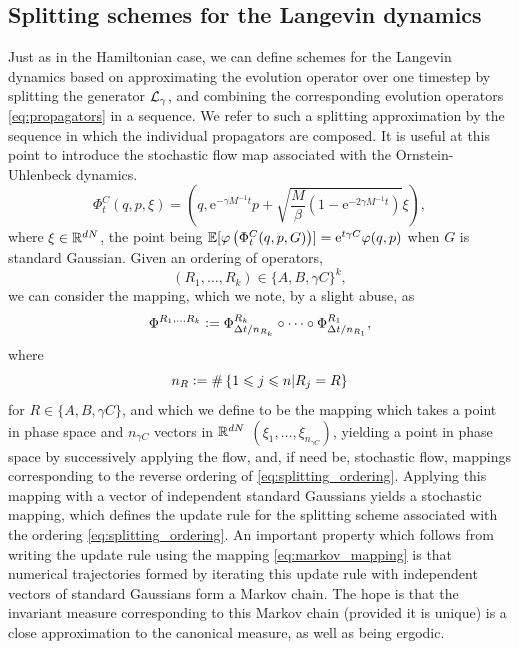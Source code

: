 \subsection{Splitting schemes for the Langevin dynamics}\label{section:splitting_schemes_langevin}
Just as in the Hamiltonian case, we can define schemes for the Langevin dynamics based on approximating the evolution operator over one timestep by splitting the generator $\mathcal{L}_\gamma$, and combining the corresponding evolution operators \eqref{eq:propagators} in a sequence.
We refer to such a splitting approximation by the sequence in which the individual propagators are composed. It is useful at this point to introduce the stochastic flow map associated with the Ornstein-Uhlenbeck dynamics.
\begin{equation}
    \label{eq:stochastic_flow_c}
    \Phi_t^C(q,p,\xi)=\left(q, \mathrm e^{-\gamma M^{-1}t}p + \sqrt{\frac{M}{\beta}(1-\mathrm{e}^{-2\gamma M^{-1}t})}\xi\right),
\end{equation}
where $\xi\in \mathbb{R}^{dN}$, the point being $\mathbb{E}[\varphi\left(\Phi_t^C(q,p,G)\right)]=\mathrm{e}^{t\gamma C}\varphi(q,p)$ when $G$ is standard Gaussian.
Given an ordering of operators, 
\begin{equation}\label{eq:splitting_ordering}(R_1,\dots,R_k)\in \{A,B,\gamma C\}^k,\end{equation}
we can consider the mapping, which we note, by a slight abuse, as
\begin{equation}\label{eq:markov_mapping}\Phi^{R_1,\dots R_k}\mathrel{\mathop:}=\Phi_{\Delta t/n_{R_k}}^{R_k}\circ\dots\circ\Phi_{\Delta t/n_{R_1}}^{R_1},
\end{equation}
where
$$n_R\mathrel{\mathop:}= \#\left\{1\leqslant j\leqslant n \middle| R_j=R\right\}$$
for $R\in\{A,B,\gamma C\}$, and which we define to be the mapping which takes a point in phase space and $n_{\gamma C}$ vectors in $\mathbb{R}^{dN}$ $(\xi_1,\dots,\xi_{n_{\gamma C}})$, yielding a point in phase space by successively applying the flow, and, if need be, stochastic flow, mappings corresponding to the reverse ordering of \eqref{eq:splitting_ordering}.
Applying this mapping with a vector of independent standard Gaussians yields a stochastic mapping, which defines the update rule for the splitting scheme associated with the ordering \eqref{eq:splitting_ordering}.
An important property which follows from writing the update rule using the mapping \eqref{eq:markov_mapping} is that numerical trajectories formed by iterating this update rule with independent vectors of standard Gaussians form a Markov chain.
The hope is that the invariant measure corresponding to this Markov chain (provided it is unique) is a close approximation to the canonical measure, as well as being ergodic.

